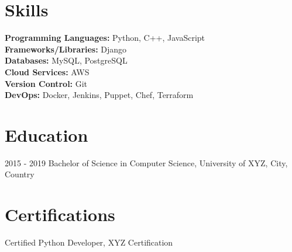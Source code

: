 \documentclass[a4paper,10pt]{article}
\begin{document}
\section*{Skills}
\begin{flushleft}
{

\textbf{Programming Languages:} Python, C++, JavaScript \\
\textbf{Frameworks/Libraries:} Django \\
\textbf{Databases:} MySQL, PostgreSQL \\
\textbf{Cloud Services:} AWS \\
\textbf{Version Control:} Git \\
\textbf{DevOps:} Docker, Jenkins, Puppet, Chef, Terraform}
\end{flushleft}

\section*{Education}
{2015 - 2019 Bachelor of Science in Computer Science, University of XYZ, City, Country}

\section*{Certifications}
{

Certified Python Developer, XYZ Certification}
\end{document}
